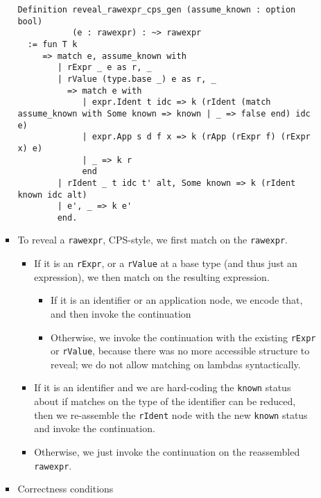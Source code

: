 \begin{itemize}
\begin{itemize}
\begin{itemize}
\begin{verbatim}
Definition reveal_rawexpr_cps_gen (assume_known : option bool)
           (e : rawexpr) : ~> rawexpr
  := fun T k
     => match e, assume_known with
        | rExpr _ e as r, _
        | rValue (type.base _) e as r, _
          => match e with
             | expr.Ident t idc => k (rIdent (match assume_known with Some known => known | _ => false end) idc e)
             | expr.App s d f x => k (rApp (rExpr f) (rExpr x) e)
             | _ => k r
             end
        | rIdent _ t idc t' alt, Some known => k (rIdent known idc alt)
        | e', _ => k e'
        end.
\end{verbatim}
    \item
      To reveal a \texttt{rawexpr}, CPS-style, we first match on the
      \texttt{rawexpr}.

      \begin{itemize}
      \tightlist
      \item
        If it is an \texttt{rExpr}, or a \texttt{rValue} at a base type
        (and thus just an expression), we then match on the resulting
        expression.

        \begin{itemize}
        \tightlist
        \item
          If it is an identifier or an application node, we encode that,
          and then invoke the continuation
        \item
          Otherwise, we invoke the continuation with the existing
          \texttt{rExpr} or \texttt{rValue}, because there was no more
          accessible structure to reveal; we do not allow matching on
          lambdas syntactically.
        \end{itemize}
      \item
        If it is an identifier and we are hard-coding the \texttt{known}
        status about if matches on the type of the identifier can be
        reduced, then we re-assemble the \texttt{rIdent} node with the
        new \texttt{known} status and invoke the continuation.
      \item
        Otherwise, we just invoke the continuation on the reassembled
        \texttt{rawexpr}.
      \end{itemize}
    \item
      Correctness conditions


\end{itemize}
\end{itemize}
\end{itemize}
